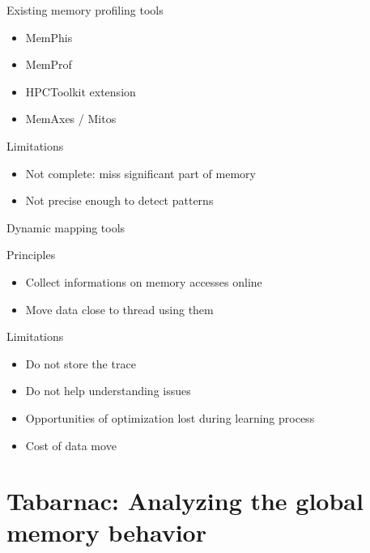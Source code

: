 \documentclass[xcolor={usenames,dvipsnames},hyperref={pdfusetitle}]{beamer}
\begin{document}
\begin{frame}{Existing memory profiling tools}
    \begin{block}{}
        \begin{itemize}
            \item  MemPhis~\cite{McCurdy10Memphis}
            \item<alert@1->  MemProf~\cite{Lachaize12MemProf}
            \item  HPCToolkit extension~\cite{Liu14Tool}
            \item <alert@1-> MemAxes / Mitos~\cite{Gimenez14Dissecting}
        \end{itemize}
    \end{block}
    \pause
    \begin{alertblock}{Limitations}
        \begin{itemize}
            \item Not complete: miss significant part of memory
            \item Not precise enough to detect patterns
        \end{itemize}
    \end{alertblock}
\end{frame}

\begin{frame}{Dynamic mapping tools~\cite{Corbet12Toward,Diener14kMAF}}
    \begin{block}{Principles}
        \begin{itemize}
            \item Collect informations on memory accesses online
            \item Move data close to thread using them
        \end{itemize}
    \end{block}
    \pause
    \begin{alertblock}{Limitations}
        \begin{itemize}
            \item Do not store the trace
            \item Do not help understanding issues
            \item Opportunities of optimization lost during learning process
            \item Cost of data move
        \end{itemize}
    \end{alertblock}
\end{frame}

\section{Tabarnac: Analyzing the global memory behavior}
\end{document}
